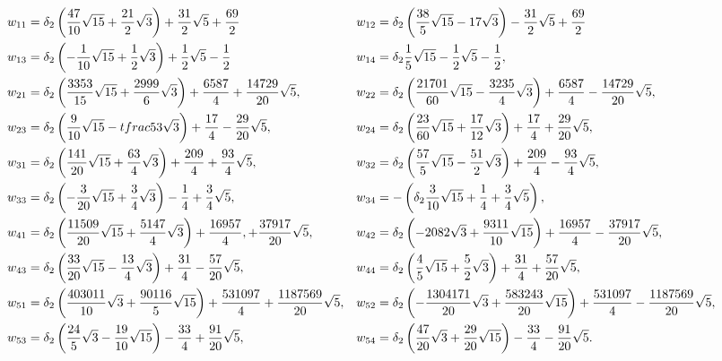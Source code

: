 \documentclass[11pt]{amsart}
\numberwithin{equation}{section}
\numberwithin{table}{section}
\newcommand\<{\langle}
\begin{document}
{ 
	\scriptsize
	\begin{align*}
		w_{11} & = \delta_2 \left(\frac{47}{10}\sqrt{15}+\frac{21}{2}\sqrt{3}\right)+\frac{31}{2}\sqrt{5} +\frac{69}{2}  &
		w_{12} & =\delta_2 \left(\frac{38}{5}\sqrt{15}-17\sqrt{3}\right)-\frac{31}{2}\sqrt{5}+\frac{69}{2}  \\
		w_{13} & = \delta_2 \left(-\frac{1}{10}\sqrt{15}+\frac{1}{2}\sqrt{3}\right)+\frac{1}{2}\sqrt{5}-\frac{1}{2}  &
		w_{14} & = \delta_2 \frac{1}{5}\sqrt{15}-\frac{1}{2}\sqrt{5}-\frac{1}{2}, \\
		w_{21} & =\delta_2\left(\frac{3353}{15}\sqrt{15}+\frac{2999}{6}\sqrt{3}\right)+\frac{6587}{4} +\frac{14729}{20}\sqrt{5}, &
		w_{22} &=\delta_2\left(\frac{21701}{60}\sqrt{15}-\frac{3235}{4}\sqrt{3}\right)+\frac{6587}{4}-\frac{14729}{20}\sqrt{5}, \\
		w_{23} & =\delta_2\left(\frac{9}{10}\sqrt{15}-tfrac{5}{3}\sqrt{3}\right)+\frac{17}{4}-\frac{29}{20}\sqrt{5}, & 
		w_{24} & =\delta_2\left(\frac{23}{60}\sqrt{15}+\frac{17}{12}\sqrt{3}\right)+\frac{17}{4}+\frac{29}{20}\sqrt{5},\\
		w_{31} & =\delta_2\left(\frac{141}{20}\sqrt{15}+\frac{63}{4}\sqrt{3}\right)+\frac{209}{4}+\frac{93}{4}\sqrt{5}, &
		w_{32} & =\delta_2\left(\frac{57}{5}\sqrt{15}-\frac{51}{2}\sqrt{3}\right)+\frac{209}{4}-\frac{93}{4}\sqrt{5},\\
		w_{33} & = \delta_2\left(-\frac{3}{20}\sqrt{15}+\frac{3}{4}\sqrt{3}\right)-\frac{1}{4}+\frac{3}{4}\sqrt{5}, & 
		w_{34} &=	-\left(\delta_2\frac{3}{10}\sqrt{15}+\frac{1}{4}+\frac{3}{4}\sqrt{5}\right),\\
		w_{41} & =\delta_2\left(\frac{11509}{20}\sqrt{15}+\frac{5147}{4}\sqrt{3}\right)+\frac{16957}{4},
		+\frac{37917}{20}\sqrt{5}, &
		w_{42} & =\delta_2\left(-2082\sqrt{3}+\frac{9311}{10}\sqrt{15}\right)+\frac{16957}{4}-\frac{37917}{20}\sqrt{5}, \\
		w_{43} & =\delta_2\left(\frac{33}{20}\sqrt{15}-\frac{13}{4}\sqrt{3}\right)+\frac{31}{4}-\frac{57}{20}\sqrt{5}, &
		w_{44} & =\delta_2\left(\frac{4}{5}\sqrt{15}+\frac{5}{2}\sqrt{3}\right)+\frac{31}{4}+\frac{57}{20}\sqrt{5},		\\
		w_{51} & ={\tiny \delta_2\left(\frac{403011}{10}\sqrt{3}+\frac{90116}{5}\sqrt{15}\right)+\frac{531097}{4}+\frac{1187569}{20}\sqrt{5},} &
		w_{52} & ={\tiny \delta_2\left(-\frac{1304171}{20}\sqrt{3}+\frac{583243}{20}\sqrt{15}\right)+\frac{531097}{4}-\frac{1187569}{20}\sqrt{5},} \\
		w_{53} & = \delta_2\left(\frac{24}{5}\sqrt{3}-\frac{19}{10}\sqrt{15}\right)-\frac{33}{4}+\frac{91}{20}\sqrt{5},&
		w_{54} & =\delta_2\left(\frac{47}{20}\sqrt{3}+\frac{29}{20}\sqrt{15}\right)-\frac{33}{4}
		-\frac{91}{20}\sqrt{5}.
\end{align*}}
\end{document}

